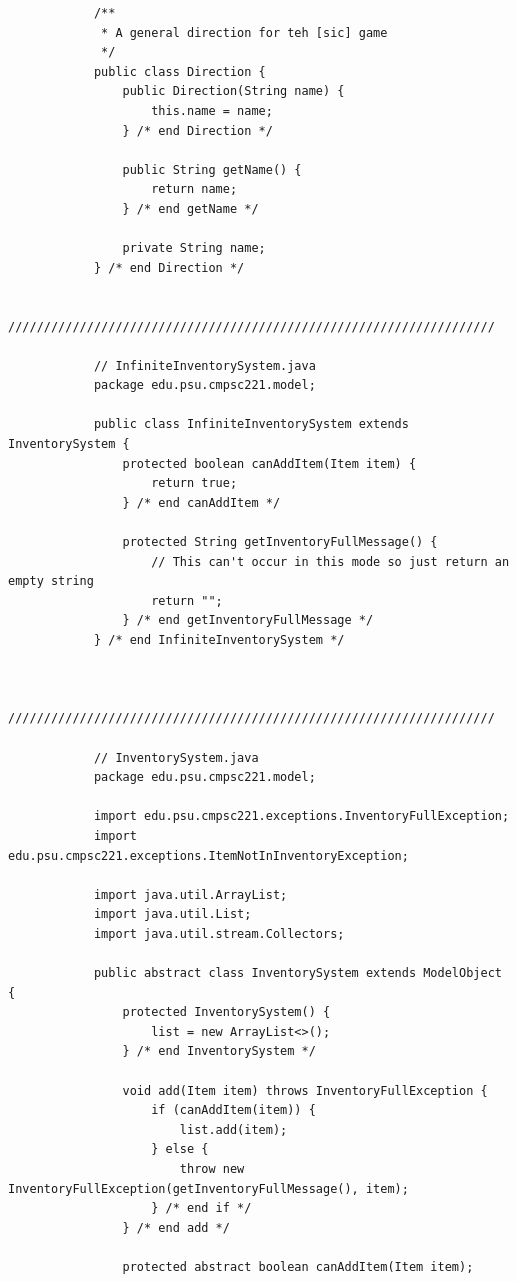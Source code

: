 \documentclass[a4paper, 11pt]{article}
\begin{document}
\begin{lstlisting}
            /**
             * A general direction for teh [sic] game
             */
            public class Direction {
                public Direction(String name) {
                    this.name = name;
                } /* end Direction */

                public String getName() {
                    return name;
                } /* end getName */

                private String name;
            } /* end Direction */

            ////////////////////////////////////////////////////////////////////

            // InfiniteInventorySystem.java
            package edu.psu.cmpsc221.model;

            public class InfiniteInventorySystem extends InventorySystem {
                protected boolean canAddItem(Item item) {
                    return true;
                } /* end canAddItem */

                protected String getInventoryFullMessage() {
                    // This can't occur in this mode so just return an empty string
                    return "";
                } /* end getInventoryFullMessage */
            } /* end InfiniteInventorySystem */


            ////////////////////////////////////////////////////////////////////

            // InventorySystem.java
            package edu.psu.cmpsc221.model;

            import edu.psu.cmpsc221.exceptions.InventoryFullException;
            import edu.psu.cmpsc221.exceptions.ItemNotInInventoryException;

            import java.util.ArrayList;
            import java.util.List;
            import java.util.stream.Collectors;

            public abstract class InventorySystem extends ModelObject {
                protected InventorySystem() {
                    list = new ArrayList<>();
                } /* end InventorySystem */

                void add(Item item) throws InventoryFullException {
                    if (canAddItem(item)) {
                        list.add(item);
                    } else {
                        throw new InventoryFullException(getInventoryFullMessage(), item);
                    } /* end if */
                } /* end add */

                protected abstract boolean canAddItem(Item item);


\end{lstlisting}
\end{document}

